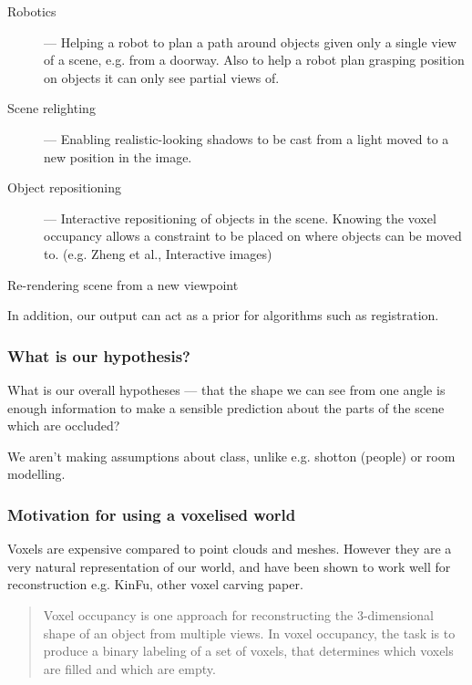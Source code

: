 \documentclass[10pt,a4paper]{article}
\makeatletter
\newcommand*{\eg}{e.g.\@\xspace}
\newcommand*{\ea}{et al.\@\xspace}
\makeatother
\begin{document}
\begin{description}

\item[Robotics] --- Helping a robot to plan a path around objects given only a single view of a scene, e.g. from a doorway. Also to help a robot plan grasping position on objects it can only see partial views of.

\item[Scene relighting] --- Enabling realistic-looking shadows to be cast from a light moved to a new position in the image.

\item[Object repositioning] --- Interactive repositioning of objects in the scene. Knowing the voxel occupancy allows a constraint to be placed on where objects can be moved to. (\eg Zheng \ea, Interactive images)

\item[Re-rendering scene from a new viewpoint]
\end{description}

In addition, our output can act as a prior for algorithms such as registration.


\subsubsection{What is our hypothesis?}

What is our overall hypotheses --- that the shape we can see from one angle is enough information to make a sensible prediction about the parts of the scene which are occluded?

We aren't making assumptions about class, unlike \eg shotton (people) or room modelling.

\subsubsection{Motivation for using a voxelised world}

Voxels are expensive compared to point clouds and meshes. 
However they are a very natural representation of our world, and have been shown to work well for reconstruction \eg KinFu, other voxel carving paper. 

\begin{quote}
Voxel occupancy is one approach for reconstructing the 3-dimensional shape of an object from multiple views. In voxel occupancy, the task is to produce a binary labeling of a set of voxels, that determines which voxels are filled and which are empty.

\cite{snow-cvpr-2000}
\end{quote}
\end{document}
